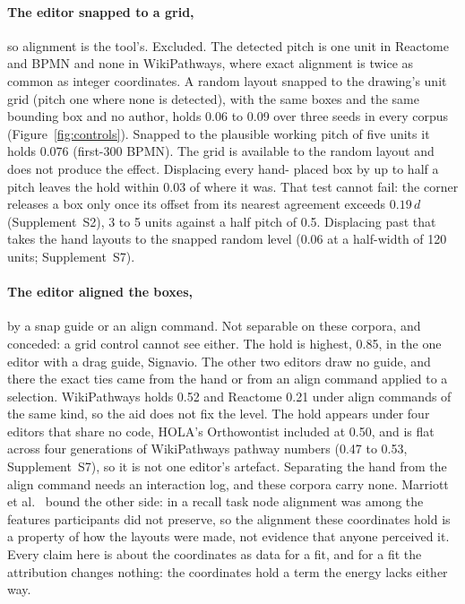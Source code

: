 \documentclass[11pt]{article}
\begin{document}
\paragraph{The editor snapped to a grid,} so alignment is the tool's. Excluded. The
detected pitch is one unit in Reactome and BPMN and none in WikiPathways, where exact
alignment is twice as common as integer coordinates. A random layout snapped to the
drawing's unit grid (pitch one where none is detected), with the same boxes and the same
bounding box and no author, holds 0.06 to 0.09 over three seeds in every corpus (Figure~\ref{fig:controls}). Snapped
to the plausible working pitch of five units it holds 0.076 (first-300 BPMN). The grid is
available to the random layout and does not produce the effect. Displacing every hand-
placed box by up to half a pitch leaves the hold within 0.03 of where it was. That test
cannot fail: the corner releases a box only once its
offset from its nearest agreement exceeds $0.19\,d$ (Supplement~S2), 3 to 5 units
against a half pitch of 0.5. Displacing past that takes the hand layouts to the snapped
random level (0.06 at a half-width of 120 units; Supplement~S7).

\paragraph{The editor aligned the boxes,} by a snap guide or an align command. Not
separable on these corpora, and conceded: a grid control cannot see either. The hold is
highest, 0.85, in the one editor with a drag guide, Signavio. The other two editors draw
no guide, and there the exact ties came from the hand or from an align command applied to
a selection. WikiPathways holds 0.52 and Reactome 0.21 under align commands of the same
kind, so the aid does not fix the level. The hold appears under four editors that share
no code, HOLA's Orthowontist included at 0.50, and is flat across four generations of
WikiPathways pathway numbers (0.47 to 0.53, Supplement~S7), so it is not one editor's
artefact. Separating the hand from the align command needs an interaction log, and these
corpora carry none. Marriott et al.\ \cite{marriott12} bound the other side: in a
recall task node alignment was among the features participants did not preserve, so the
alignment these coordinates hold is a property of how the layouts were
made, not evidence that anyone perceived it. Every claim here is about the coordinates as data for
a fit, and for a fit the attribution changes nothing: the coordinates hold a term the
energy lacks either way.
\end{document}
